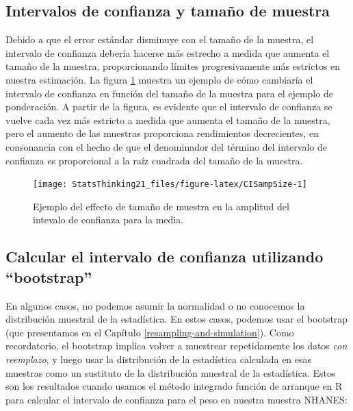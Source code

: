 \documentclass[
  12pt,
]{book}
\theoremstyle{definition}
\theoremstyle{definition}
\theoremstyle{definition}
\theoremstyle{remark}
\begin{document}
\hypertarget{intervalos-de-confianza-y-tamauxf1o-de-muestra}{%
\subsection{Intervalos de confianza y tamaño de muestra}\label{intervalos-de-confianza-y-tamauxf1o-de-muestra}}

Debido a que el error estándar disminuye con el tamaño de la muestra, el intervalo de confianza debería hacerse más estrecho a medida que aumenta el tamaño de la muestra, proporcionando límites progresivamente más estrictos en nuestra estimación. La figura \ref{fig:CISampSize} muestra un ejemplo de cómo cambiaría el intervalo de confianza en función del tamaño de la muestra para el ejemplo de ponderación. A partir de la figura, es evidente que el intervalo de confianza se vuelve cada vez más estricto a medida que aumenta el tamaño de la muestra, pero el aumento de las muestras proporciona rendimientos decrecientes, en consonancia con el hecho de que el denominador del término del intervalo de confianza es proporcional a la raíz cuadrada del tamaño de la muestra.

\begin{figure}
\texttt{[image: StatsThinking21\_files/figure-latex/CISampSize-1]} \caption{Ejemplo del effecto de tamaño de muestra en la amplitud del intevalo de confianza para la media.}\label{fig:CISampSize}
\end{figure}

\hypertarget{calcular-el-intervalo-de-confianza-utilizando-bootstrap}{%
\subsection{Calcular el intervalo de confianza utilizando ``bootstrap''}\label{calcular-el-intervalo-de-confianza-utilizando-bootstrap}}

En algunos casos, no podemos asumir la normalidad o no conocemos la distribución muestral de la estadística. En estos casos, podemos usar el bootstrap (que presentamos en el Capítulo \ref{resampling-and-simulation}). Como recordatorio, el bootstrap implica volver a muestrear repetidamente los datos \emph{con reemplazo}, y luego usar la distribución de la estadística calculada en esas muestras como un sustituto de la distribución muestral de la estadística. Estos son los resultados cuando usamos el método integrado función de arranque en R para calcular el intervalo de confianza para el peso en nuestra muestra NHANES:
\end{document}
